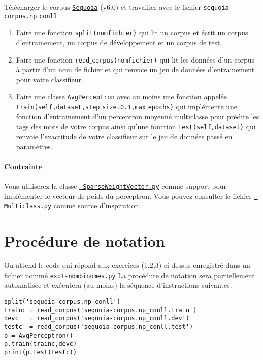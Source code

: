 \documentclass[a4paper,12pts]{article}
\begin{document}
Télécharger le corpus
\href{https://gforge.inria.fr/frs/?group_id=3597}{\tt Sequoia} (v6.0) et travailler avec le fichier {\tt sequoia-corpus.np$\_$conll}
\begin{enumerate}
\item Faire une fonction {\tt split(nomfichier)} qui lit un corpus et
  écrit un corpus d'entrainement, un corpus de développement et un
  corpus de test.
\item Faire une fonction {\tt read$\_$corpus(nomfichier)} qui lit les données d'un
  corpus à partir d'un nom de fichier et qui renvoie un jeu de données
  d'entrainement pour votre classifieur.
\item  Faire une classe {\tt AvgPerceptron}
avec au moins une fonction appelée\\ {\tt train(self,dataset,step$\_$size=0.1,max$\_$epochs)}
qui implémente une
fonction d'entrainement d'un perceptron moyenné multiclasse pour
prédire les tags des mots de votre corpus ainsi qu'une fonction
{\tt test(self,dataset)} qui renvoie l'exactitude de votre classifieur sur
le jeu de données passé en paramètres.
\end{enumerate}
\paragraph{Contrainte} Vous utiliserez la classe
\href{https://github.com/bencrabbe/parsing-at-diderot/blob/master/SparseWeightVector.py}{\tt
  SparseWeightVector.py} comme support pour implémenter le vecteur de
poids du perceptron. Vous pouvez consulter le fichier 
\href{https://github.com/bencrabbe/parsing-at-diderot/blob/master/Multiclass.py}{\tt
  Multiclass.py} comme source d'inspiration.



\section{Procédure de notation}
On attend le code qui répond aux exercices (1,2,3) ci-dessus
enregistré dans un fichier nommé {\tt exo1-nombinomes.py} 
La procédure de notation sera partiellement automatisée et exécutera (au moins) la séquence d'instructions suivantes.
\begin{verbatim}
split('sequoia-corpus.np_conll')
trainc = read_corpus('sequoia-corpus.np_conll.train')
devc   = read_corpus('sequoia-corpus.np_conll.dev')
testc  = read_corpus('sequoia-corpus.np_conll.test')
p = AvgPerceptron()
p.train(trainc,devc)
print(p.test(testc))
\end{verbatim}
\end{document}
